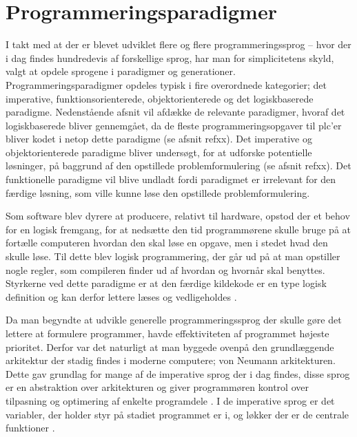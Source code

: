\section{Programmeringsparadigmer}\label{sec:paradigmer}\label{ssec:hovedparadigmer}

I takt med at der er blevet udviklet flere og flere programmeringssprog – hvor der i dag findes hundredevis af forskellige sprog, har man for simplicitetens skyld, valgt at opdele sprogene i paradigmer og generationer. Programmeringsparadigmer opdeles typisk i fire overordnede kategorier; det imperative, funktionsorienterede, objektorienterede og det logiskbaserede paradigme. Nedenstående afsnit vil afdække de relevante paradigmer, hvoraf det logiskbaserede bliver gennemgået, da de fleste programmeringsopgaver til \gls{plc}’er bliver kodet i netop dette paradigme (se afsnit refxx). Det imperative og objektorienterede paradigme bliver undersøgt, for at udforske potentielle løsninger, på baggrund af den opstillede problemformulering (se afsnit refxx). Det funktionelle paradigme vil blive undladt fordi paradigmet er irrelevant for den færdige løsning, som ville kunne løse den opstillede problemformulering.

Som software blev dyrere at producere, relativt til hardware, opstod der et behov for en logisk fremgang, for at nedsætte den tid programmørene skulle bruge på at fortælle computeren hvordan den skal løse en opgave, men i stedet hvad den skulle løse. Til dette blev logisk programmering, der går ud på at man opstiller nogle regler, som compileren finder ud af hvordan og hvornår skal benyttes. Styrkerne ved dette paradigme er at den færdige kildekode er en type logisk definition og kan derfor lettere læses og vedligeholdes \cite[kapitel 16]{Sebesta_2013}.

Da man begyndte at udvikle generelle programmeringssprog der skulle gøre det lettere at formulere programmer, havde effektiviteten af programmet højeste prioritet. Derfor var det naturligt at man byggede ovenpå den grundlæggende arkitektur der stadig findes i moderne computere; von Neumann arkitekturen. Dette gav grundlag for mange af de imperative sprog der i dag findes, disse sprog er en abstraktion over arkitekturen og giver programmøren kontrol over tilpasning og optimering af enkelte programdele \cite[38-39]{Sebesta_2013}. I de imperative sprog er det variabler, der holder styr på stadiet programmet er i, og løkker der er de centrale funktioner \cite{Sebesta_2013}.


